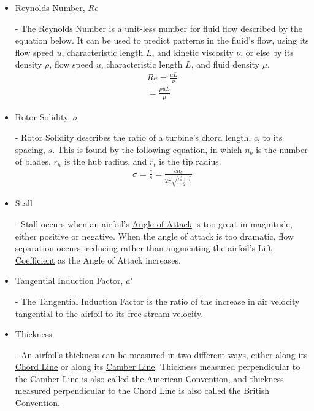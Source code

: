 \documentclass{article}
\begin{document}
\begin{itemize}
	\item \hypertarget{Re}{Reynolds Number, $Re$} - The Reynolds Number is a unit-less number for fluid flow described by the equation below. It can be used to predict patterns in the fluid's flow, using its flow speed $u$, characteristic length $L$, and kinetic viscosity $\nu$, or else by its density $\rho$, flow speed $u$, characteristic length $L$, and fluid density $\mu$.
		\begin{equation} \label{eq:17}
		\begin{aligned}
        			Re = \frac{uL}{\nu} \\
			= \frac{\rho uL}{\mu} 
	    	\end{aligned}
		\end{equation}
	
	\item \hypertarget{sigma}{Rotor Solidity, $\sigma$} - Rotor Solidity describes the ratio of a turbine's chord length, $c$, to its spacing, $s$. This is found by the following equation, in which $n_{b}$ is the number of blades, $r_{h}$ is the hub radius, and $r_{t}$ is the tip radius.
	\begin{equation}
	\begin{aligned}
		\sigma = \frac{c}{s} = \frac{c n_{b}}{2 \pi \sqrt{\frac{r^{2}_{h} + r^{2}_{t}}{2}}}
	\end{aligned}
	\end{equation}
	
	\item \hypertarget{ST}{Stall} - Stall occurs when an airfoil's \hyperlink{alpha}{Angle of Attack} is too great in magnitude, either positive or negative. When the angle of attack is too dramatic, flow separation occurs, reducing rather than augmenting the airfoil's \hyperlink{CL}{Lift Coefficient} as the Angle of Attack increases.
	
	\item \hypertarget{a'}{Tangential Induction Factor, $a'$} - The Tangential Induction Factor is the ratio of the increase in air velocity tangential to the airfoil to its free stream velocity.
	
	\item \hypertarget{Th}{Thickness} - An airfoil's thickness can be measured in two different ways, either along its \hyperlink{c}{Chord Line} or along its \hyperlink{Camber}{Camber Line}. Thickness measured perpendicular to the Camber Line is also called the American Convention, and thickness measured perpendicular to the Chord Line is also called the British Convention.
	

\end{itemize}
\end{document}

